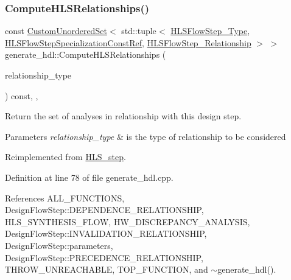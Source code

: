 \subsubsection{\texorpdfstring{Compute\+H\+L\+S\+Relationships()}{ComputeHLSRelationships()}}
{\footnotesize\ttfamily const \hyperlink{classCustomUnorderedSet}{Custom\+Unordered\+Set}$<$ std\+::tuple$<$ \hyperlink{hls__step_8hpp_ada16bc22905016180e26fc7e39537f8d}{H\+L\+S\+Flow\+Step\+\_\+\+Type}, \hyperlink{hls__step_8hpp_a5fdd2edf290c196531d21d68e13f0e74}{H\+L\+S\+Flow\+Step\+Specialization\+Const\+Ref}, \hyperlink{hls__step_8hpp_a3ad360b9b11e6bf0683d5562a0ceb169}{H\+L\+S\+Flow\+Step\+\_\+\+Relationship} $>$ $>$ generate\+\_\+hdl\+::\+Compute\+H\+L\+S\+Relationships (\begin{DoxyParamCaption}\item[{const \hyperlink{classDesignFlowStep_a723a3baf19ff2ceb77bc13e099d0b1b7}{Design\+Flow\+Step\+::\+Relationship\+Type}}]{relationship\+\_\+type }\end{DoxyParamCaption}) const\hspace{0.3cm}{\ttfamily [override]}, {\ttfamily [protected]}, {\ttfamily [virtual]}}



Return the set of analyses in relationship with this design step. 


\begin{DoxyParams}{Parameters}
{\em relationship\+\_\+type} & is the type of relationship to be considered \\
\hline
\end{DoxyParams}


Reimplemented from \hyperlink{classHLS__step_aed0ce8cca9a1ef18e705fc1032ad4de5}{H\+L\+S\+\_\+step}.



Definition at line 78 of file generate\+\_\+hdl.\+cpp.



References A\+L\+L\+\_\+\+F\+U\+N\+C\+T\+I\+O\+NS, Design\+Flow\+Step\+::\+D\+E\+P\+E\+N\+D\+E\+N\+C\+E\+\_\+\+R\+E\+L\+A\+T\+I\+O\+N\+S\+H\+IP, H\+L\+S\+\_\+\+S\+Y\+N\+T\+H\+E\+S\+I\+S\+\_\+\+F\+L\+OW, H\+W\+\_\+\+D\+I\+S\+C\+R\+E\+P\+A\+N\+C\+Y\+\_\+\+A\+N\+A\+L\+Y\+S\+IS, Design\+Flow\+Step\+::\+I\+N\+V\+A\+L\+I\+D\+A\+T\+I\+O\+N\+\_\+\+R\+E\+L\+A\+T\+I\+O\+N\+S\+H\+IP, Design\+Flow\+Step\+::parameters, Design\+Flow\+Step\+::\+P\+R\+E\+C\+E\+D\+E\+N\+C\+E\+\_\+\+R\+E\+L\+A\+T\+I\+O\+N\+S\+H\+IP, T\+H\+R\+O\+W\+\_\+\+U\+N\+R\+E\+A\+C\+H\+A\+B\+LE, T\+O\+P\+\_\+\+F\+U\+N\+C\+T\+I\+ON, and $\sim$generate\+\_\+hdl().

